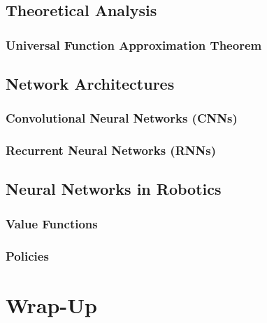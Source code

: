 		\subsection{Theoretical Analysis} %

			\subsubsection{Universal Function Approximation Theorem} %

		\subsection{Network Architectures} %

			\subsubsection{Convolutional Neural Networks (CNNs)} %

			\subsubsection{Recurrent Neural Networks (RNNs)} %

		\subsection{Neural Networks in Robotics} %

			\subsubsection{Value Functions} %

			\subsubsection{Policies} %

	\section{Wrap-Up} %

